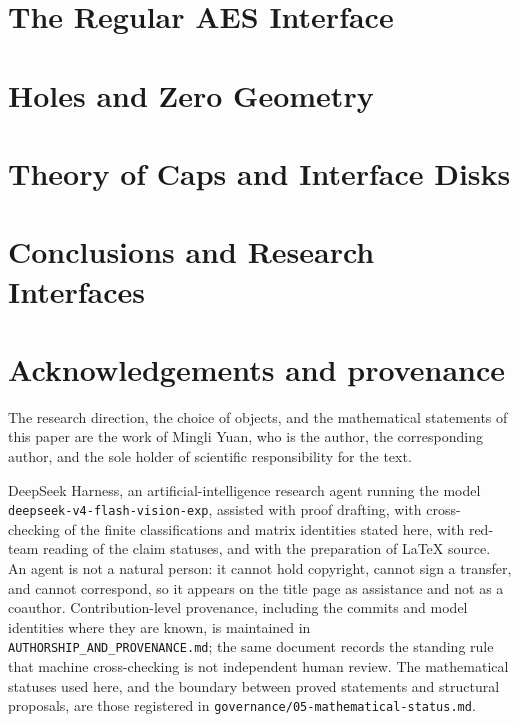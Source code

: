 \documentclass[11pt]{article}
\theoremstyle{definition}
\theoremstyle{remark}
\begin{document}
\section{The Regular AES Interface}\label{sec:regular-aes-interface}

\section{Holes and Zero Geometry}\label{sec:zero-geometry}

\section{Theory of Caps and Interface Disks}\label{sec:theory-of-caps}

\section{Conclusions and Research Interfaces}\label{sec:conclusion}


\section*{Acknowledgements and provenance}
The research direction, the choice of objects, and the mathematical statements
of this paper are the work of Mingli Yuan, who is the author, the corresponding
author, and the sole holder of scientific responsibility for the text.

DeepSeek Harness, an artificial-intelligence research agent running the model
\texttt{deepseek-v4-\allowbreak flash-vision-exp}, assisted with proof drafting, with
cross-checking of the finite classifications and matrix identities stated here,
with red-team reading of the claim statuses, and with the preparation of
\LaTeX{} source.  An agent is not a natural person: it cannot hold copyright,
cannot sign a transfer, and cannot correspond, so it appears on the title page
as assistance and not as a coauthor.  Contribution-level provenance, including
the commits and model identities where they are known, is maintained in
\texttt{AUTHORSHIP\_AND\_PROVENANCE.md}; the same document records the standing
rule that machine cross-checking is not independent human review.  The
mathematical statuses used here, and the boundary between proved statements and
structural proposals, are those registered in
\texttt{governance/05-mathematical-status.md}.
\end{document}
